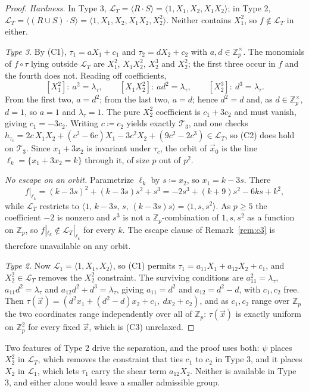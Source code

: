 \documentclass{conjura-solution}
\newcommand{\Zp}{\mathbb{Z}_p}
\newcommand{\Zpx}{\mathbb{Z}_p^{\times}}
\newcommand{\vx}{\vec{x}}
\newcommand{\LL}{\mathcal{L}}
\newcommand{\Span}[1]{\langle #1 \rangle} %
\begin{document}
\begin{proof}
\emph{Hardness.} In Type 3, $\LL_T=\Span{R\cdot S}=\Span{1,X_1,X_2,X_1X_2}$; in Type 2,
$\LL_T=\Span{(R\cup S)\cdot S}=\Span{1,X_1,X_2,X_1X_2,X_2^{2}}$. Neither contains $X_1^{2}$,
so $f\notin\LL_T$ in either.

\emph{Type 3.} By (C1), $\tau_1=aX_1+c_1$ and $\tau_2=dX_2+c_2$ with $a,d\in\Zpx$. The
monomials of $f\circ\tau$ lying outside $\LL_T$ are $X_1^{2}$, $X_1X_2^{2}$, $X_2^{3}$ and
$X_2^{2}$; the first three occur in $f$ and the fourth does not. Reading off coefficients,
\[
  [X_1^{2}]:\ a^{2}=\lambda_\tau,\qquad
  [X_1X_2^{2}]:\ ad^{2}=\lambda_\tau,\qquad
  [X_2^{3}]:\ d^{3}=\lambda_\tau.
\]
From the first two, $a=d^{2}$; from the last two, $a=d$; hence $d^{2}=d$ and, as
$d\in\Zpx$, $d=1$, so $a=1$ and $\lambda_\tau=1$. The pure $X_2^{2}$ coefficient is
$c_1+3c_2$ and must vanish, giving $c_1=-3c_2$. Writing $c\coloneqq c_2$ yields exactly
$\mathcal T_3$, and one checks $h_{\tau_c}=2c\,X_1X_2+(c^{2}-6c)X_1-3c^{2}X_2+(9c^{2}-2c^{3})
\in\LL_T$, so (C2) does hold on $\mathcal T_3$. Since $x_1+3x_2$ is invariant under $\tau_c$,
the orbit of $\vx_0$ is the line $\ell_k=\{x_1+3x_2=k\}$ through it, of size $p$ out of
$p^{2}$.

\emph{No escape on an orbit.} Parametrize $\ell_k$ by $s\coloneqq x_2$, so $x_1=k-3s$. There
\[
  f|_{\ell_k}=(k-3s)^{2}+(k-3s)s^{2}+s^{3}=-2s^{3}+(k+9)s^{2}-6ks+k^{2},
\]
while $\LL_T$ restricts to $\Span{1,\,k-3s,\,s,\,(k-3s)s}=\Span{1,s,s^{2}}$. As $p\ge 5$ the
coefficient $-2$ is nonzero and $s^{3}$ is not a $\Zp$-combination of $1,s,s^{2}$ as a
function on $\Zp$, so $f|_{\ell_k}\notin\LL_T|_{\ell_k}$ for every $k$. The escape clause of
Remark~\ref{rem:c3} is therefore unavailable on any orbit.

\emph{Type 2.} Now $\LL_1=\Span{1,X_1,X_2}$, so (C1) permits $\tau_1=a_{11}X_1+a_{12}X_2+c_1$,
and $X_2^{2}\in\LL_T$ removes the $X_2^{2}$ constraint. The surviving conditions are
$a_{11}^{2}=\lambda_\tau$, $a_{11}d^{2}=\lambda_\tau$ and $a_{12}d^{2}+d^{3}=\lambda_\tau$,
giving $a_{11}=d^{2}$ and $a_{12}=d^{2}-d$, with $c_1,c_2$ free. Then
$\tau(\vx)=(d^{2}x_1+(d^{2}-d)x_2+c_1,\ dx_2+c_2)$, and as $c_1,c_2$ range over $\Zp$ the two
coordinates range independently over all of $\Zp$: $\tau(\vx)$ is exactly uniform on $\Zp^{2}$
for every fixed $\vx$, which is (C3) unrelaxed.
\end{proof}

Two features of Type 2 drive the separation, and the proof uses both: $\psi$ places $X_2^{2}$
in $\LL_T$, which removes the constraint that ties $c_1$ to $c_2$ in Type 3, and it places
$X_2$ in $\LL_1$, which lets $\tau_1$ carry the shear term $a_{12}X_2$. Neither is available
in Type 3, and either alone would leave a smaller admissible group.
\end{document}

